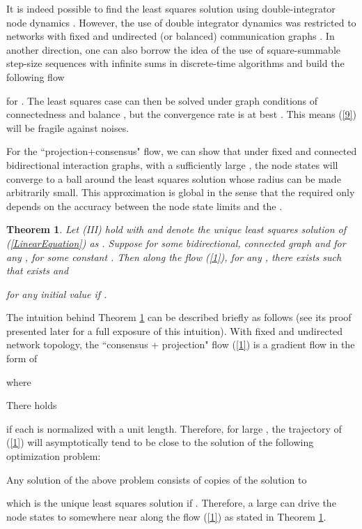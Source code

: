 \documentclass[a4paper, 11pt]{article}
\newtheorem{theorem}{Theorem}
\begin{document}
It is indeed possible to find the least squares solution using  double-integrator node dynamics \cite{elia,cotes14}.  However, the use of double integrator dynamics was  restricted to   networks with fixed and undirected (or balanced) communication graphs \cite{elia,cotes14}. In another direction,  one can also borrow the idea of  the use of    square-summable step-size sequences with infinite sums in discrete-time algorithms \cite{nedic10} and  build the following flow

for .
The least squares case can then be solved under graph conditions of connectedness and balance \cite{nedic10}, but the convergence rate is at best . This means (\ref{9}) will be fragile against noises.



For the ``projection+consensus" flow, we can show that under fixed and connected bidirectional interaction graphs,  with a sufficiently large , the node states will converge to  a ball around the least squares solution whose radius can be made arbitrarily small. This approximation is global in the sense that the required  only depends on the accuracy between the node state limits and the .
\begin{theorem}\label{thm5}
Let (III) hold with  and  denote the unique least squares solution of (\ref{LinearEquation}) as .  Suppose  for some bidirectional, connected graph  and for any ,  for some constant . Then   along  the flow (\ref{1}), for any , there exists  such that  exists and
 
for any initial value  if .
\end{theorem}



The intuition behind Theorem \ref{thm5} can be described briefly as follows (see its proof presented later for a full exposure of this intuition). With fixed and undirected network topology,  the ``consensus + projection" flow (\ref{1}) is a gradient flow  in the form of

where

There  holds

if each  is normalized with a unit length. Therefore, for large , the trajectory of (\ref{1}) will asymptotically  tend to  be close to the solution of the following optimization problem:

Any solution of the above problem  consists of   copies of the solution to

which is  the unique least squares  solution  if . Therefore, a large  can drive the node states to somewhere near  along the flow (\ref{1}) as stated in Theorem \ref{thm5}.
\end{document}
